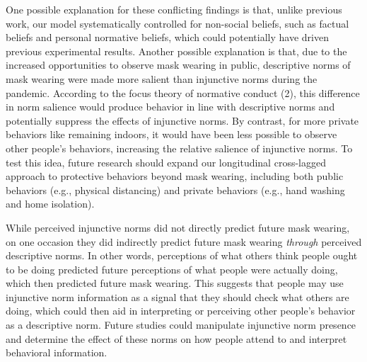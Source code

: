 \documentclass[
  man, donotrepeattitle,floatsintext]{apa6}
\begin{document}
One possible explanation for these conflicting findings is that, unlike previous work, our model systematically controlled for non-social beliefs, such as factual beliefs and personal normative beliefs, which could potentially have driven previous experimental results. Another possible explanation is that, due to the increased opportunities to observe mask wearing in public, descriptive norms of mask wearing were made more salient than injunctive norms during the pandemic. According to the focus theory of normative conduct (2), this difference in norm salience would produce behavior in line with descriptive norms and potentially suppress the effects of injunctive norms. By contrast, for more private behaviors like remaining indoors, it would have been less possible to observe other people's behaviors, increasing the relative salience of injunctive norms. To test this idea, future research should expand our longitudinal cross-lagged approach to protective behaviors beyond mask wearing, including both public behaviors (e.g., physical distancing) and private behaviors (e.g., hand washing and home isolation).

While perceived injunctive norms did not directly predict future mask wearing, on one occasion they did indirectly predict future mask wearing \emph{through} perceived descriptive norms. In other words, perceptions of what others think people ought to be doing predicted future perceptions of what people were actually doing, which then predicted future mask wearing. This suggests that people may use injunctive norm information as a signal that they should check what others are doing, which could then aid in interpreting or perceiving other people's behavior as a descriptive norm. Future studies could manipulate injunctive norm presence and determine the effect of these norms on how people attend to and interpret behavioral information.
\end{document}
